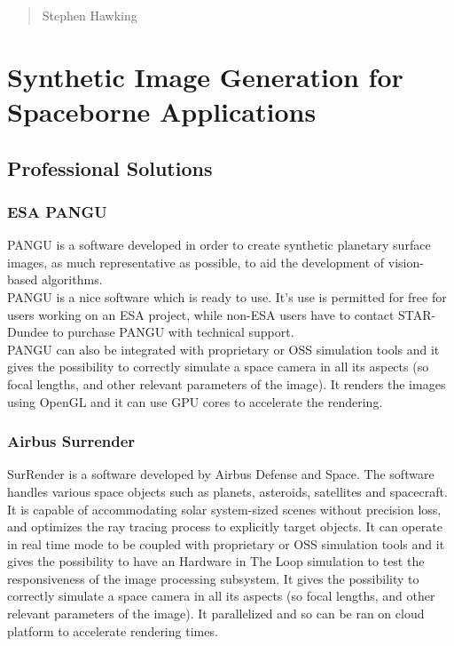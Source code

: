 \begin{quotation}
{\footnotesize
{}
\begin{flushright}
Stephen Hawking
\end{flushright}
}
\end{quotation}
\vspace{0.5cm}


\section{Synthetic Image Generation for Spaceborne Applications}

\subsection{Professional Solutions}

\subsubsection{ESA PANGU}
PANGU is a software developed in order to create synthetic planetary surface images, as much representative as possible, to aid the development of vision-based algorithms.\cite{10.2514/6.2004-592-389}\\
PANGU is a nice software which is ready to use. It's use is permitted for free for users working on an ESA project, while non-ESA users have to contact STAR-Dundee to purchase PANGU with technical support.\\
PANGU can also be integrated with proprietary or OSS simulation tools and it gives the possibility to correctly simulate a space camera in all its aspects (so focal lengths, and other relevant parameters of the image). It renders the images using OpenGL and it can use GPU cores to accelerate the rendering.

\subsubsection{Airbus Surrender}
SurRender is a software developed by Airbus Defense and Space. The software handles various space objects such as planets, asteroids, satellites and spacecraft.\\
It is capable of accommodating solar system-sized scenes without precision loss, and optimizes the ray tracing process to explicitly target objects. It can operate in real time mode to be coupled with  proprietary or OSS simulation tools and it gives the possibility to have an Hardware in The Loop simulation to test the responsiveness of the image processing subsystem. It gives the possibility to correctly simulate a space camera in all its aspects (so focal lengths, and other relevant parameters of the image). It parallelized and so can be ran on cloud platform to accelerate rendering times.\\

